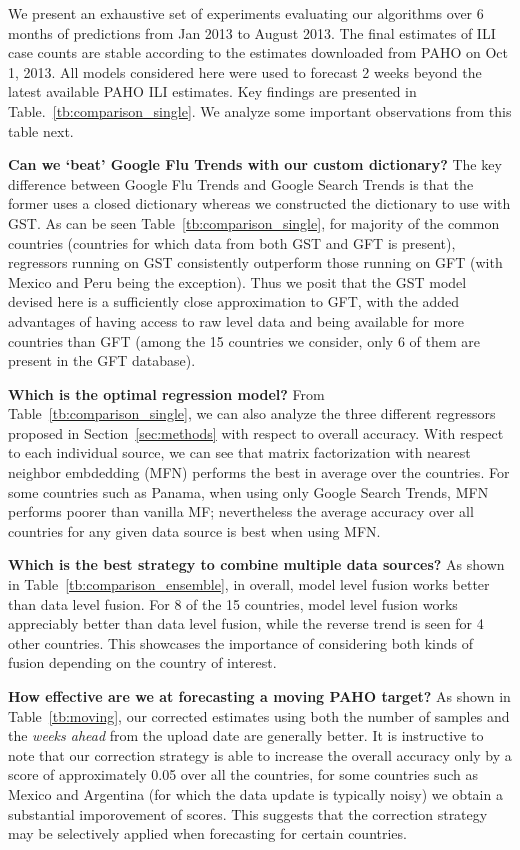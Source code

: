 We present an exhaustive set of experiments evaluating our algorithms 
over 6 months of predictions 
from Jan 2013 to August 2013. The final estimates of ILI case counts are stable according
to the estimates downloaded from PAHO on Oct 1, 2013. All models considered here were
used to forecast 2 weeks beyond the latest available PAHO ILI estimates. 
Key findings
are presented in 
Table.~\ref{tb:comparison_single}. We analyze 
some important observations from this table next.




{\noindent \textbf{Can we `beat' Google Flu Trends with our custom dictionary?}}  
The key difference between Google Flu Trends and Google Search Trends is that the former uses a closed dictionary whereas
we constructed the dictionary to use with GST.
As can be seen Table~\ref{tb:comparison_single},
for majority of the common countries (countries for which data from both GST and GFT
is present), regressors running on GST consistently 
outperform those running on GFT (with Mexico and Peru being the exception).
Thus we posit that the GST model devised here is a sufficiently close approximation to GFT, 
with the added advantages of having access to raw level data and being available for more countries 
than GFT (among the 15 countries we consider, only 6 of them are present in the GFT database).

{\noindent \textbf{Which is the optimal regression model?}} From Table~\ref{tb:comparison_single}, we can also
analyze the three different regressors proposed in Section~\ref{sec:methods} with respect to overall accuracy.
With respect to each individual source, we can see that matrix factorization with nearest 
neighbor embdedding (MFN) performs the best in average over the countries.
For some countries such as Panama, when using only Google Search Trends, MFN
performs poorer than vanilla MF; nevertheless the average accuracy over all countries for any given
data source is best when using MFN.



{\noindent \textbf{Which is the best strategy to combine
multiple data sources?}} 
As shown in Table~\ref{tb:comparison_ensemble}, in overall,
model level fusion works better than data level fusion.
For 8 of the 15 countries, model level fusion works
appreciably better than data level fusion, while the reverse trend is seen for 4 other countries. 
This showcases the importance of considering both kinds of fusion depending on the country of interest.


{\noindent \textbf{How effective are we at forecasting a moving PAHO target?}} 
As shown in Table~\ref{tb:moving}, 
our
corrected estimates 
using both the number of samples and 
the {\it weeks ahead} from the upload date are generally better. It is instructive to note that
our correction strategy is
able to increase the overall accuracy only by a score of approximately 0.05 over all the countries, 
for some countries such as Mexico and Argentina (for which the data update is typically noisy) we obtain 
a substantial imporovement of scores. This suggests that the correction strategy may be selectively applied 
when forecasting for certain countries. 





